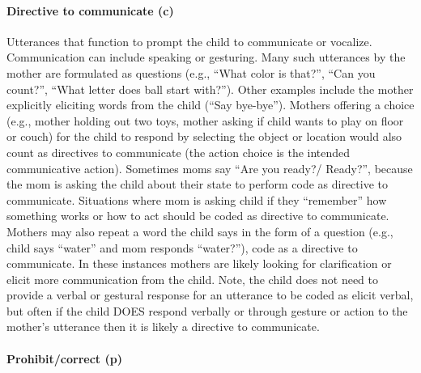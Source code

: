 \documentclass[
]{book}
\begin{document}
\hypertarget{directive_to_communicate}{%
\paragraph*{Directive to communicate (c)}\label{directive_to_communicate}}

Utterances that function to prompt the child to communicate or vocalize. Communication can include speaking or gesturing. Many such utterances by the mother are formulated as questions (e.g., ``What color is that?'', ``Can you count?'', ``What letter does ball start with?''). Other examples include the mother explicitly eliciting words from the child (``Say bye-bye''). Mothers offering a choice (e.g., mother holding out two toys, mother asking if child wants to play on floor or couch) for the child to respond by selecting the object or location would also count as directives to communicate (the action choice is the intended communicative action). Sometimes moms say ``Are you ready?/ Ready?'', because the mom is asking the child about their state to perform code as directive to communicate. Situations where mom is asking child if they ``remember'' how something works or how to act should be coded as directive to communicate.
Mothers may also repeat a word the child says in the form of a question (e.g., child says ``water'' and mom responds ``water?''), code as a directive to communicate. In these instances mothers are likely looking for clarification or elicit more communication from the child.
Note, the child does not need to provide a verbal or gestural response for an utterance to be coded as elicit verbal, but often if the child DOES respond verbally or through gesture or action to the mother's utterance then it is likely a directive to communicate.

\hypertarget{prohibit_correct}{%
\paragraph*{Prohibit/correct (p)}\label{prohibit_correct}}
\end{document}
